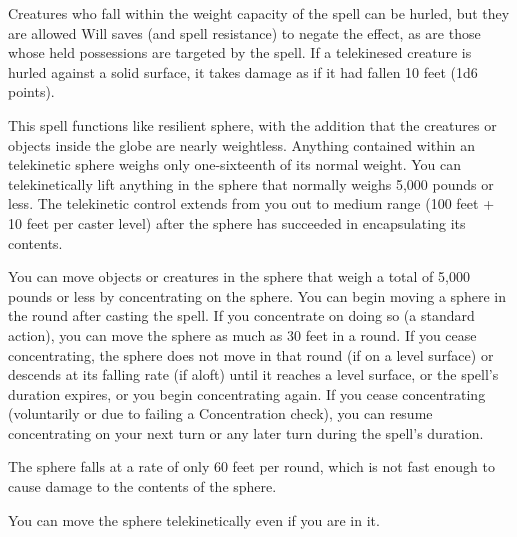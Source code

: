 \begin{multicols}{2}
\begin{small}
{\smallskip\noindent Creatures who fall within the weight capacity of the spell can be hurled, but they are allowed Will saves (and spell resistance) to negate the effect, as are those whose held possessions are targeted by the spell. If a telekinesed creature is hurled against a solid surface, it takes damage as if it had fallen 10 feet (1d6 points).}

\noindent This spell functions like resilient sphere, with the addition that the creatures or objects inside the globe are nearly weightless. Anything contained within an telekinetic sphere weighs only one-sixteenth of its normal weight. You can telekinetically lift anything in the sphere that normally weighs 5,000 pounds or less. The telekinetic control extends from you out to medium range (100 feet + 10 feet per caster level) after the sphere has succeeded in encapsulating its contents.

\smallskip\noindent You can move objects or creatures in the sphere that weigh a total of 5,000 pounds or less by concentrating on the sphere. You can begin moving a sphere in the round after casting the spell. If you concentrate on doing so (a standard action), you can move the sphere as much as 30 feet in a round. If you cease concentrating, the sphere does not move in that round (if on a level surface) or descends at its falling rate (if aloft) until it reaches a level surface, or the spell's duration expires, or you begin concentrating again. If you cease concentrating (voluntarily or due to failing a Concentration check), you can resume concentrating on your next turn or any later turn during the spell's duration.

\smallskip\noindent The sphere falls at a rate of only 60 feet per round, which is not fast enough to cause damage to the contents of the sphere.

\smallskip\noindent You can move the sphere telekinetically even if you are in it.



\end{small}
\end{multicols}
